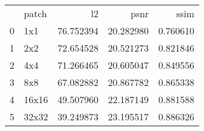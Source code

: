 \begin{tabular}{llrrr}
 & patch & l2 & psnr & ssim \\
0 & 1x1 & 76.752394 & 20.282980 & 0.760610 \\
1 & 2x2 & 72.654528 & 20.521273 & 0.821846 \\
2 & 4x4 & 71.266465 & 20.605047 & 0.849556 \\
3 & 8x8 & 67.082882 & 20.867782 & 0.865338 \\
4 & 16x16 & 49.507960 & 22.187149 & 0.881588 \\
5 & 32x32 & 39.249873 & 23.195517 & 0.886326 \\
\end{tabular}

